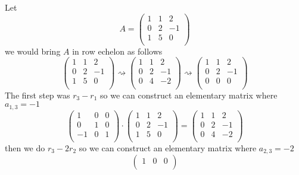 \begin{example}
   Let
   \[A = \begin{pmatrix}
         1 & 1 &  2 \\
         0 & 2 & -1 \\
         1 & 5 & 0 \\
      \end{pmatrix}
   \]
   we would bring \(A\) in row echelon as follows
   \[\begin{pmatrix}
         1 & 1 &  2 \\
         0 & 2 & -1 \\
         1 & 5 & 0 \\
      \end{pmatrix} \rightsquigarrow \begin{pmatrix}
         1 & 1 &  2 \\
         0 & 2 & -1 \\
         0 & 4 & -2 \\
      \end{pmatrix} \rightsquigarrow \begin{pmatrix}
         1 & 1 &  2 \\
         0 & 2 & -1 \\
         0 & 0 & 0 \\
      \end{pmatrix}
   \]
   The first step was \(r_3 - r_1\) so we can construct an elementary matrix where \(a_{1,3} = -1\)
   \[\begin{pmatrix}
         1  & 0 & 0 \\
         0  & 1 & 0 \\
         -1 & 0 & 1 \\
      \end{pmatrix} \cdot \begin{pmatrix}
         1 & 1 &  2 \\
         0 & 2 & -1 \\
         1 & 5 & 0 \\
      \end{pmatrix} = \begin{pmatrix}
         1 & 1 &  2 \\
         0 & 2 & -1 \\
         0 & 4 & -2 \\
      \end{pmatrix}
   \]
   then we do \(r_3 - 2r_2\) so we can construct an elementary matrix where \(a_{2,3} = -2\)
   \[\begin{pmatrix}
         1 & 0  & 0 \\

\end{pmatrix}\]
\end{example}
